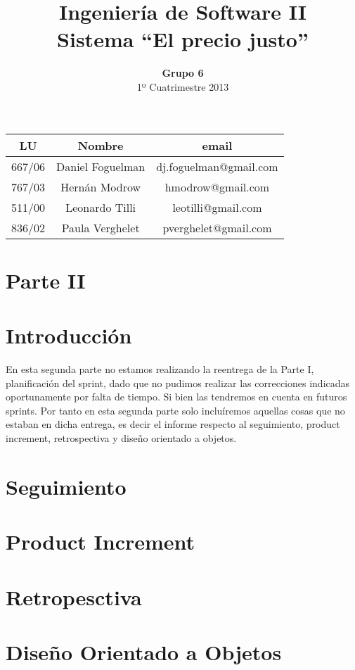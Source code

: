 \documentclass[a4paper,8pt]{article}
\title{Ingeniería de Software II\\ \textbf{Sistema ``El precio justo''}}
\author{\textbf{Grupo 6}\\ 1º Cuatrimestre 2013}
\date{}
\begin{document}
\maketitle
\vspace{10cm}
\begin{center}

\begin{tabular}{|c|c|c|}
\hline
\hline
\textbf{LU}&\textbf{Nombre}&\textbf{email}\\
\hline
667/06&Daniel Foguelman &dj.foguelman@gmail.com\\
\hline
767/03&Hernán Modrow&hmodrow@gmail.com\\
\hline
511/00&Leonardo Tilli&leotilli@gmail.com\\
\hline
836/02&Paula Verghelet&pverghelet@gmail.com\\
\hline
\hline
\end{tabular}
\end{center}
\newpage

\section{Parte II}

\section{Introducción}

En esta segunda parte no estamos realizando la reentrega de la Parte I, planificación del sprint, dado que no pudimos realizar las correcciones indicadas oportunamente por falta de tiempo. Si bien las tendremos en cuenta en futuros sprints. 
Por tanto en esta segunda parte solo incluíremos aquellas cosas que no estaban en dicha entrega, es decir el informe respecto al seguimiento, product increment, retrospectiva y diseño orientado a objetos. 

\section{Seguimiento}



\section{Product Increment}



\section{Retropesctiva}



\section{Diseño Orientado a Objetos}


\end{document}
